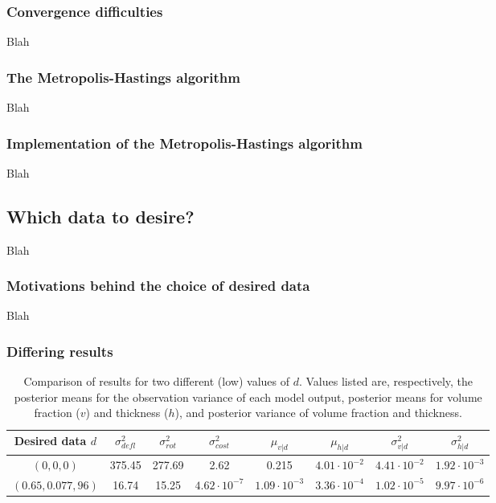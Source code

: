 \documentclass{article}
\begin{document}
\subsubsection{Convergence difficulties}
Blah

\subsubsection{The Metropolis-Hastings algorithm}
Blah

\subsubsection{Implementation of the Metropolis-Hastings algorithm}
Blah

\subsection{Which data to desire?}
Blah

\subsubsection{Motivations behind the choice of desired data}
Blah

\subsubsection{Differing results}
\begin{table}[h]
\centering
\begin{tabular}{| c | c  | c  |  c | c  | c | c | c |}
\hline
Desired data $d$ & $\sigma^2_{defl}$ & $\sigma^2_{rot}$ & $\sigma^2_{cost}$ & $\mu_{v|d}$ &
                            $\mu_{h|d}$ & $\sigma^2_{v|d}$ & $\sigma^2_{h|d}$\\
\hline
$(0, 0, 0)$ & 375.45 & 277.69 & 2.62 & 0.215 & $4.01 \cdot 10^{-2}$&
	$4.41\cdot 10^{-2}$ & $1.92 \cdot 10^{-3}$\\
$(0.65, 0.077, 96)$ & 16.74 & 15.25 & $4.62 \cdot 10^{-7}$ &
	$1.09 \cdot 10^{-3}$ & $3.36 \cdot10^{-4}$ &
	$1.02 \cdot 10^{-5}$ & $9.97 \cdot 10^{-6}$\\
\hline
\end{tabular}
\caption{Comparison of results for two different (low) values of $d$. Values listed are, respectively, the posterior means for the observation variance of each model output, posterior means for volume fraction ($v$) and thickness ($h$), and posterior variance of volume fraction and thickness.}
\label{table:d_comp}
\end{table}
\end{document}
